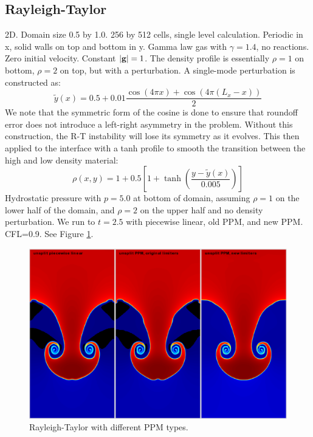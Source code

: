 \subsection{Rayleigh-Taylor}
2D.  Domain size 0.5 by 1.0.  256 by 512 cells, single level
calculation.  Periodic in x, solid walls on top and bottom in y.
Gamma law gas with $\gamma=1.4$, no reactions.  Zero initial velocity.
Constant $|{\bf g}|=1$.  The density profile is essentially $\rho=1$ on
bottom, $\rho=2$ on top, but with a perturbation.  A single-mode
perturbation is constructed as:
\begin{equation}
\tilde y(x) = 0.5 + 0.01 \frac{\cos(4\pi x) + \cos(4\pi(L_x - x))}{2}
\end{equation}
We note that the symmetric form of the cosine is done to ensure that 
roundoff error does not introduce a left-right asymmetry in the problem.
Without this construction, the R-T instability will lose its symmetry
as it evolves.  This then applied to the interface with a tanh profile
to smooth the transition between the high and low density material:
\begin{equation}
\rho(x,y) = 1 + 0.5\left[1+\tanh\left(\frac{y-\tilde y(x)}{0.005}\right)\right]
\end{equation}
Hydrostatic pressure with $p=5.0$ at bottom of domain, assuming
$\rho=1$ on the lower half of the domain, and $\rho=2$ on the upper
half and no density perturbation.  We run to $t=2.5$ with piecewise
linear, old PPM, and new PPM.  CFL=0.9.  See Figure \ref{fig:RT}.
\begin{figure}[h]
\centering
\includegraphics[width=6.5in]{CastroVerification/RT_ppm_type}
\caption{\label{fig:RT}Rayleigh-Taylor with different PPM types.}
\end{figure}

